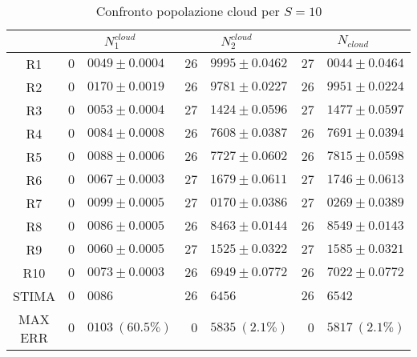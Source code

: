 \begin{table}[!h]
\begin{tabular}{c|r@{.}l|r@{.}l|r@{.}l}
& \multicolumn{2}{|c|}{$N_1^{cloud}$}
& \multicolumn{2}{|c|}{$N_2^{cloud}$}
& \multicolumn{2}{|c}{$N_{cloud}$} 
\\          
\hline
R1      & $0$&$0049 \pm 0.0004$ & $26$&$9995 \pm 0.0462$ & $27$&$0044 \pm 0.0464$ \\
R2      & $0$&$0170 \pm 0.0019$ & $26$&$9781 \pm 0.0227$ & $26$&$9951 \pm 0.0224$ \\
R3      & $0$&$0053 \pm 0.0004$ & $27$&$1424 \pm 0.0596$ & $27$&$1477 \pm 0.0597$ \\
R4      & $0$&$0084 \pm 0.0008$ & $26$&$7608 \pm 0.0387$ & $26$&$7691 \pm 0.0394$ \\
R5      & $0$&$0088 \pm 0.0006$ & $26$&$7727 \pm 0.0602$ & $26$&$7815 \pm 0.0598$ \\
R6      & $0$&$0067 \pm 0.0003$ & $27$&$1679 \pm 0.0611$ & $27$&$1746 \pm 0.0613$ \\
R7      & $0$&$0099 \pm 0.0005$ & $27$&$0170 \pm 0.0386$ & $27$&$0269 \pm 0.0389$ \\
R8      & $0$&$0086 \pm 0.0005$ & $26$&$8463 \pm 0.0144$ & $26$&$8549 \pm 0.0143$ \\
R9      & $0$&$0060 \pm 0.0005$ & $27$&$1525 \pm 0.0322$ & $27$&$1585 \pm 0.0321$ \\
R10     & $0$&$0073 \pm 0.0003$ & $26$&$6949 \pm 0.0772$ & $26$&$7022 \pm 0.0772$ \\
STIMA   & $0$&$0086$            & $26$&$6456$            & $26$&$6542$            \\
MAX ERR & $0$&$0103 \ (60.5\%)$ & $0$&$5835 \ (2.1\%)$   & $0$&$5817 \ (2.1\%)$     
\end{tabular}
\centering
\caption{Confronto popolazione cloud per $S=10$}
\label{tab:10_ncloud}
\end{table}
